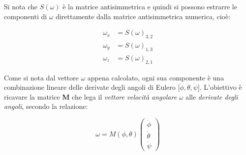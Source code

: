 \documentclass[11pt, a4paper]{article}
\begin{document}
\begin{par}
\begin{flushleft}
Si nota che $S(\omega)$ è la matrice antisimmetrica e quindi si possono estrarre le componenti di $\omega$ direttamente dalla matrice antisimmetrica numerica, cioè:
\end{flushleft}
\end{par}

\[
\begin{aligned}
    \omega_x &= S(\omega)_{3,2} \\
    \omega_y &= S(\omega)_{1,3} \\
    \omega_z &= S(\omega)_{2,1}
\end{aligned}
\]

\begin{par}
\begin{flushleft}
Come si nota dal vettore $\omega$ appena calcolato, ogni sua componente è una combinazione lineare delle derivate degli angoli di Eulero $\bigl\lbrack \dot{\phi} ,\dot{\theta} ,\dot{\psi} \bigr\rbrack$. L'obiettivo è ricavare la matrice \textbf{M} che lega il \textit{vettore} \textit{velocità angolare }$\omega$ alle \textit{derivate degli angoli}, secondo la relazione:
\end{flushleft}
\end{par}

\[
    \omega = M(\phi ,\theta ) \left(\begin{array}{c}
    \dot{\phi} \\
    \dot{\theta} \\
    \dot{\psi}
    \end{array}\right)
\]


\vspace{1em}

\end{document}
